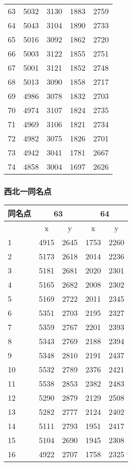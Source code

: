 \begin{center}
\begin{supertabular}{|l|cc|cc|}
      63 & 5032 & 3130 & 1883 & 2759 \\
      64 & 5043 & 3104 & 1890 & 2733 \\
      65 & 5016 & 3092 & 1862 & 2720 \\
      66 & 5003 & 3122 & 1855 & 2751 \\
      67 & 5001 & 3121 & 1852 & 2748 \\
      68 & 5013 & 3090 & 1858 & 2717 \\
      69 & 4986 & 3078 & 1832 & 2703 \\
      70 & 4974 & 3107 & 1824 & 2735 \\
      71 & 4969 & 3106 & 1821 & 2734 \\
      72 & 4982 & 3075 & 1826 & 2701 \\
      73 & 4942 & 3041 & 1781 & 2667 \\
      74 & 4858 & 3004 & 1697 & 2626 \\
      \end{supertabular}%
  \end{center}%
  
\subsubsection{西北一同名点}

\begin{table}[htbp]
    \centering
      \begin{tabular}{|l|cc|cc|}
        \hline
      同名点 & \multicolumn{2}{c|}{63} & \multicolumn{2}{c|}{64} \\
      \hline
         & x  & y  & x  & y \\ \hline
      1  & 4915 & 2645 & 1753 & 2260 \\
      2  & 5173 & 2618 & 2014 & 2236 \\
      3  & 5181 & 2681 & 2020 & 2301 \\
      4  & 5165 & 2682 & 2008 & 2302 \\
      5  & 5169 & 2722 & 2011 & 2345 \\
      6  & 5351 & 2703 & 2195 & 2327 \\
      7  & 5359 & 2767 & 2201 & 2393 \\
      8  & 5343 & 2769 & 2188 & 2394 \\
      9  & 5348 & 2810 & 2191 & 2437 \\
      10 & 5532 & 2789 & 2376 & 2421 \\
      11 & 5538 & 2853 & 2382 & 2483 \\
      12 & 5290 & 2879 & 2129 & 2508 \\
      13 & 5282 & 2777 & 2124 & 2402 \\
      14 & 5111 & 2793 & 1951 & 2417 \\
      15 & 5104 & 2690 & 1945 & 2308 \\
      16 & 4922 & 2707 & 1758 & 2325 \\
      \hline
      \end{tabular}%
  \end{table}%
  

